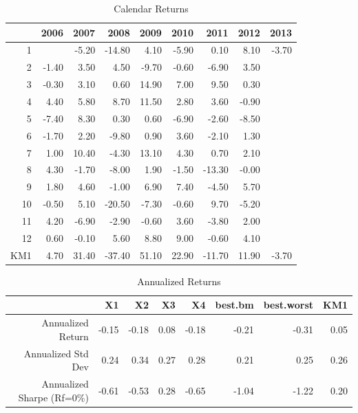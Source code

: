 \documentclass{article}
\begin{document}
\begin{table}[ht]
\begin{center}
\caption{Calendar Returns}
\begin{tabular}{rrrrrrrrr}
  \hline
 & 2006 & 2007 & 2008 & 2009 & 2010 & 2011 & 2012 & 2013 \\ 
  \hline
1 &  & -5.20 & -14.80 & 4.10 & -5.90 & 0.10 & 8.10 & -3.70 \\ 
  2 & -1.40 & 3.50 & 4.50 & -9.70 & -0.60 & -6.90 & 3.50 &  \\ 
  3 & -0.30 & 3.10 & 0.60 & 14.90 & 7.00 & 9.50 & 0.30 &  \\ 
  4 & 4.40 & 5.80 & 8.70 & 11.50 & 2.80 & 3.60 & -0.90 &  \\ 
  5 & -7.40 & 8.30 & 0.30 & 0.60 & -6.90 & -2.60 & -8.50 &  \\ 
  6 & -1.70 & 2.20 & -9.80 & 0.90 & 3.60 & -2.10 & 1.30 &  \\ 
  7 & 1.00 & 10.40 & -4.30 & 13.10 & 4.30 & 0.70 & 2.10 &  \\ 
  8 & 4.30 & -1.70 & -8.00 & 1.90 & -1.50 & -13.30 & -0.00 &  \\ 
  9 & 1.80 & 4.60 & -1.00 & 6.90 & 7.40 & -4.50 & 5.70 &  \\ 
  10 & -0.50 & 5.10 & -20.50 & -7.30 & -0.60 & 9.70 & -5.20 &  \\ 
  11 & 4.20 & -6.90 & -2.90 & -0.60 & 3.60 & -3.80 & 2.00 &  \\ 
  12 & 0.60 & -0.10 & 5.60 & 8.80 & 9.00 & -0.60 & 4.10 &  \\ 
  KM1 & 4.70 & 31.40 & -37.40 & 51.10 & 22.90 & -11.70 & 11.90 & -3.70 \\ 
   \hline
\end{tabular}
\end{center}
\end{table}%
\begin{table}[ht]
\begin{center}
\caption{Annualized Returns}
\begin{tabular}{rrrrrrrr}
  \hline
 & X1 & X2 & X3 & X4 & best.bm & best.worst & KM1 \\ 
  \hline
Annualized Return & -0.15 & -0.18 & 0.08 & -0.18 & -0.21 & -0.31 & 0.05 \\ 
  Annualized Std Dev & 0.24 & 0.34 & 0.27 & 0.28 & 0.21 & 0.25 & 0.26 \\ 
  Annualized Sharpe (Rf=0\%) & -0.61 & -0.53 & 0.28 & -0.65 & -1.04 & -1.22 & 0.20 \\ 
   \hline
\end{tabular}
\end{center}
\end{table}%
\end{document}
